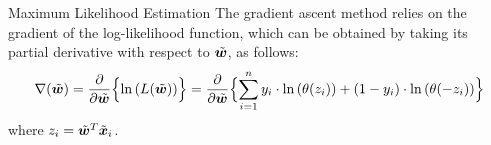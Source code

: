 \begin{frame}{Maximum Likelihood Estimation}
The gradient ascent method relies on the gradient of the log-likelihood
function, which can be obtained by taking its partial derivative 
with respect to $\tilde{{\boldsymbol w}}$, as follows:
\begin{align*}
    \nabla(\tilde{{\boldsymbol w}}) = 
    \frac{\partial}{\partial \tilde{{\boldsymbol w}}} \Bigl\{\ln\left( L(\tilde{{\boldsymbol w}})
    \right)\Bigr\}
    = 
\frac{\partial}{\partial \tilde{{\boldsymbol w}}} \Bigl\{\sum_{i=1}^n y_i \cdot \ln \left( \theta(z_i) \right) +
(1-y_i) \cdot \ln \left( \theta(-z_i) \right) \Bigr\}
\end{align*}
where $z_i = \tilde{{\boldsymbol w}}^T\tilde{{\boldsymbol x}}_i$.
%
%


\end{frame}

